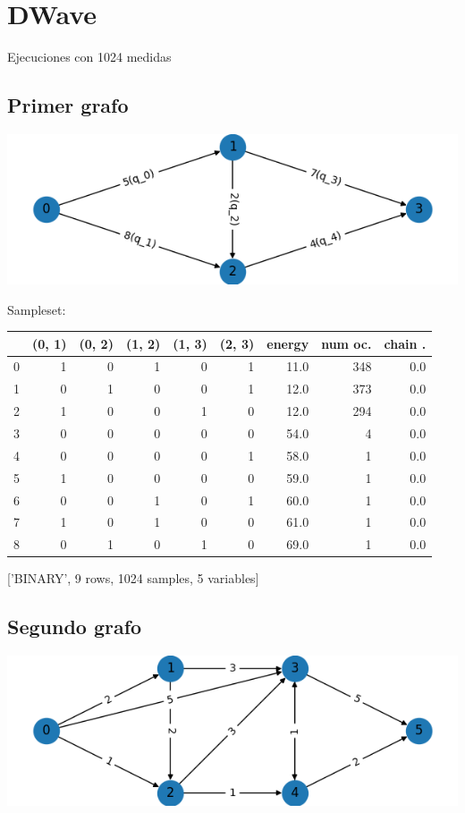 \documentclass[letterpaper]{article}
\begin{document}
\newpage
\section{DWave}
\label{sec:orgd7e336e}
Ejecuciones con 1024 medidas
\subsection{Primer grafo}
\label{sec:org36476b8}
\begin{center}
\includegraphics[width=.9\linewidth]{./img/primer_grafo/primer_grafo.png}
\end{center}

Sampleset:
\begin{center}
\begin{tabular}{|r|r|r|r|r|r|r|r|r|}
\hline
 & (0, 1) & (0, 2) & (1, 2) & (1, 3) & (2, 3) & energy & num oc. & chain .\\
\hline
0 & 1 & 0 & 1 & 0 & 1 & 11.0 & 348 & 0.0\\
1 & 0 & 1 & 0 & 0 & 1 & 12.0 & 373 & 0.0\\
2 & 1 & 0 & 0 & 1 & 0 & 12.0 & 294 & 0.0\\
3 & 0 & 0 & 0 & 0 & 0 & 54.0 & 4 & 0.0\\
4 & 0 & 0 & 0 & 0 & 1 & 58.0 & 1 & 0.0\\
5 & 1 & 0 & 0 & 0 & 0 & 59.0 & 1 & 0.0\\
6 & 0 & 0 & 1 & 0 & 1 & 60.0 & 1 & 0.0\\
7 & 1 & 0 & 1 & 0 & 0 & 61.0 & 1 & 0.0\\
8 & 0 & 1 & 0 & 1 & 0 & 69.0 & 1 & 0.0\\
\hline
\end{tabular}
\end{center}
['BINARY', 9 rows, 1024 samples, 5 variables]

\newpage
\subsection{Segundo grafo}
\label{sec:org8bae427}
\begin{center}
\includegraphics[width=.9\linewidth]{./img/segundo_grafo.png}
\end{center}
\end{document}
